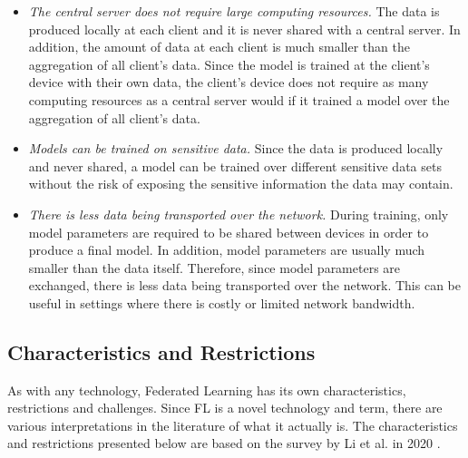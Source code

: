 \begin{itemize}
    \item \textit{The central server does not require large computing resources.} The data is produced locally at each client and it is never shared with a central server. In addition, the amount of data at each client is much smaller than the aggregation of all client's data. Since the model is trained at the client's device with their own data, the client's device does not require as many computing resources as a central server would if it trained a model over the aggregation of all client's data.
    
    \item \textit{Models can be trained on sensitive data.} Since the data is produced locally and never shared, a model can be trained over different sensitive data sets without the risk of exposing the sensitive information the data may contain.
    
    \item \textit{There is less data being transported over the network.} During training, only model parameters are required to be shared between devices in order to produce a final model. In addition, model parameters are usually much smaller than the data itself. Therefore, since model parameters are exchanged, there is less data being transported over the network. This can be useful in settings where there is costly or limited network bandwidth.
\end{itemize}

\subsection{Characteristics and Restrictions}

As with any technology, Federated Learning has its own characteristics, restrictions and challenges. Since FL is a novel technology and term, there are various interpretations in the literature of what it actually is. The characteristics and restrictions presented below are based on the survey by Li et al. in 2020 \cite{9084352}.

